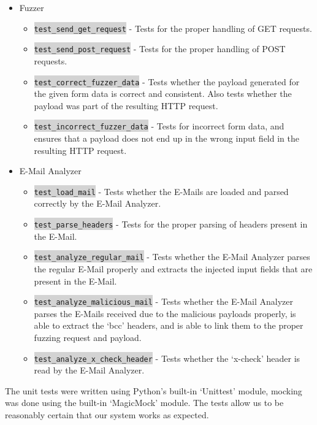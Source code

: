 \begin{itemize}
	\item Fuzzer
	\begin{itemize}
		\item \colorbox{lightgray}{\lstinline{test_send_get_request}} - Tests for the proper handling of GET requests.
		\item \colorbox{lightgray}{\lstinline{test_send_post_request}} - Tests for the proper handling of POST requests.
		\item \colorbox{lightgray}{\lstinline{test_correct_fuzzer_data}} - Tests whether the payload generated for the given form data is correct and consistent. Also tests whether the payload was part of the resulting HTTP request.
		\item \colorbox{lightgray}{\lstinline{test_incorrect_fuzzer_data}} - Tests for incorrect form data, and ensures that a payload does not end up in the wrong input field in the resulting HTTP request.
	\end{itemize}
	\item E-Mail Analyzer
	\begin{itemize}
		\item \colorbox{lightgray}{\lstinline{test_load_mail}} - Tests whether the E-Mails are loaded and parsed correctly by the E-Mail Analyzer.
		\item \colorbox{lightgray}{\lstinline{test_parse_headers}} - Tests for the proper parsing of headers present in the E-Mail.
		\item \colorbox{lightgray}{\lstinline{test_analyze_regular_mail}} - Tests whether the E-Mail Analyzer parses the regular E-Mail properly and extracts the injected input fields that are present in the E-Mail.
		\item \colorbox{lightgray}{\lstinline{test_analyze_malicious_mail}} - Tests whether the E-Mail Analyzer parses the E-Mails received due to the malicious payloads properly, is able to extract the `bcc' headers, and is able to link them to the proper fuzzing request and payload.
		\item \colorbox{lightgray}{\lstinline{test_analyze_x_check_header}} - Tests whether the `x-check' header is read by the E-Mail Analyzer.
	\end{itemize}
\end{itemize}
The unit tests were written using Python's built-in `Unittest' module, mocking was done using the built-in `MagicMock' module. The tests allow us to be reasonably certain that our system works as expected.
